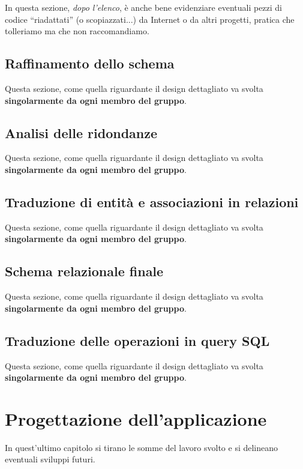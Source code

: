 \documentclass[a4paper,12pt]{report}
\begin{document}
%
In questa sezione, \textit{dopo l'elenco}, è anche bene evidenziare eventuali pezzi di codice ``riadattati'' (o scopiazzati...) da Internet o da altri progetti, pratica che tolleriamo ma che non raccomandiamo.

\section{Raffinamento dello schema}

Questa sezione, come quella riguardante il design dettagliato va svolta \textbf{singolarmente da ogni membro del gruppo}.


\section{Analisi delle ridondanze}

Questa sezione, come quella riguardante il design dettagliato va svolta \textbf{singolarmente da ogni membro del gruppo}.


\section{Traduzione di entità e associazioni in relazioni}

Questa sezione, come quella riguardante il design dettagliato va svolta \textbf{singolarmente da ogni membro del gruppo}.


\section{Schema relazionale finale}

Questa sezione, come quella riguardante il design dettagliato va svolta \textbf{singolarmente da ogni membro del gruppo}.


\section{Traduzione delle operazioni in query SQL}

Questa sezione, come quella riguardante il design dettagliato va svolta \textbf{singolarmente da ogni membro del gruppo}.



\chapter{Progettazione dell'applicazione}

In quest'ultimo capitolo si tirano le somme del lavoro svolto e si delineano eventuali sviluppi
futuri.
\end{document}
